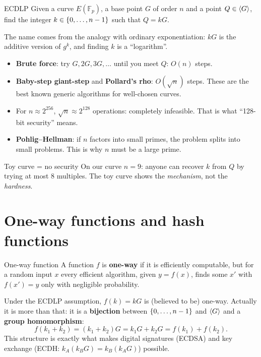 \begin{framedprob}[label={prob:ecdlp}]{ECDLP}
  Given a curve $E(\mathbb{F}_p)$, a base point $G$ of order $n$ and a point $Q \in \left\langle G \right\rangle$, find the integer $k \in \left\{0, \ldots, n-1\right\}$ such that $Q = kG$.
\end{framedprob}

The name comes from the analogy with ordinary exponentiation: $kG$ is the additive version of $g^k$, and finding $k$ is a ``logarithm''.

\begin{itemize}
  \item \textbf{Brute force}: try $G, 2G, 3G, \ldots$ until you meet $Q$: $O(n)$ steps.
  \item \textbf{Baby-step giant-step} and \textbf{Pollard's rho}: $O(\sqrt{n})$ steps. These are the best known generic algorithms for well-chosen curves.
  \item For $n \approx 2^{256}$, $\sqrt n \approx 2^{128}$ operations: completely infeasible. That is what ``128-bit security'' means.
  \item \textbf{Pohlig--Hellman}: if $n$ factors into small primes, the problem splits into small problems. This is why $n$ must be a large prime.
\end{itemize}

\begin{framedobs}{Toy curve = no security}
  On our curve $n = 9$: anyone can recover $k$ from $Q$ by trying at most 8 multiples. The toy curve shows the \textit{mechanism}, not the \textit{hardness}.
\end{framedobs}

\section{One-way functions and hash functions}

\begin{frameddefn}[label={def:owf}]{One-way function}
  A function $f$ is \textbf{one-way} if it is efficiently computable, but for a random input $x$ every efficient algorithm, given $y = f(x)$, finds some $x'$ with $f(x') = y$ only with negligible probability.
\end{frameddefn}

Under the ECDLP assumption, $f(k) = kG$ is (believed to be) one-way. Actually it is more than that: it is a \textbf{bijection} between $\left\{0, \ldots, n-1\right\}$ and $\left\langle G \right\rangle$ and a \textbf{group homomorphism}:
\[
  f(k_1 + k_2) = (k_1 + k_2)G = k_1 G + k_2 G = f(k_1) + f(k_2).
\]
This structure is exactly what makes digital signatures (ECDSA) and key exchange (ECDH: $k_A(k_B G) = k_B(k_A G)$) possible.

